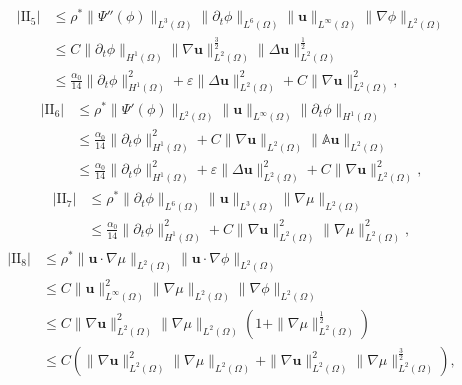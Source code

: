 \documentclass[11pt]{article}
\numberwithin{equation}{section}
\begin{document}
\begin{equation}\label{4.29}
\begin{split}
|\text{II}_5|&\leq \rho^*\|\Psi''(\phi)\|_{L^3(\Omega)}\|\partial_t\phi\|_{L^6(\Omega)}
\|\mathbf{u}\|_{L^{\infty}(\Omega)}\|\nabla\phi\|_{L^2(\Omega)} \\
&\leq C\|\partial_t\phi\|_{H^1(\Omega)}
\|\nabla\mathbf{u}\|_{L^2(\Omega)}^{\frac{3}{2}}
\|\Delta\mathbf{u}\|_{L^2(\Omega)}^{\frac{1}{2}} \\
&\leq \frac{\alpha_0}{14}\|\partial_t\phi\|_{H^1(\Omega)}^2 + \varepsilon\|\Delta\mathbf{u}\|_{L^2(\Omega)}^2 + C\|\nabla\mathbf{u}\|_{L^2(\Omega)}^2 ,
\end{split}
\end{equation}
\begin{equation}\label{4.30}
\begin{split}
|\text{II}_6|&\leq \rho^*\|\Psi'(\phi)\|_{L^2(\Omega)}\|\mathbf{u}\|_{L^{\infty}(\Omega)}
\|\partial_t\phi\|_{H^1(\Omega)}\\
&\leq \frac{\alpha_0}{14}\|\partial_t\phi\|_{H^1(\Omega)}^2 + C\|\nabla\mathbf{u}\|_{L^2(\Omega)}\|\mathbb{A}\mathbf{u}\|_{L^2(\Omega)} \\
&\leq \frac{\alpha_0}{14}\|\partial_t\phi\|_{H^1(\Omega)}^2 + \varepsilon\|\Delta\mathbf{u}\|_{L^2(\Omega)}^2 + C\|\nabla\mathbf{u}\|_{L^2(\Omega)}^2 ,
\end{split}
\end{equation}
\begin{equation}\label{4.31}
\begin{split}
|\text{II}_7|&\leq \rho^*\|\partial_t\phi\|_{L^6(\Omega)}\|\mathbf{u}\|_{L^3(\Omega)}
\|\nabla\mu\|_{L^2(\Omega)} \\
&\leq \frac{\alpha_0}{14}\|\partial_t\phi\|_{H^1(\Omega)}^2 + C\|\nabla\mathbf{u}\|_{L^2(\Omega)}^2\|\nabla\mu\|_{L^2(\Omega)}^2 ,
\end{split}
\end{equation}
\begin{equation}\label{4.32}
\begin{split}
|\text{II}_8|&\leq \rho^*\|\mathbf{u}\cdot\nabla\mu\|_{L^2(\Omega)}\|\mathbf{u}\cdot
\nabla\phi\|_{L^2(\Omega)} \\
&\leq C\|\mathbf{u}\|_{L^{\infty}(\Omega)}^2\|\nabla\mu\|_{L^2(\Omega)}
\|\nabla\phi\|_{L^2(\Omega)}\\
&\leq C\|\nabla\mathbf{u}\|_{L^2(\Omega)}^2\|\nabla\mu\|_{L^2(\Omega)}(1 + \|\nabla\mu\|_{L^2(\Omega)}^{\frac{1}{2}}) \\
&\leq C(\|\nabla\mathbf{u}\|_{L^2(\Omega)}^2\|\nabla\mu\|_{L^2(\Omega)} + \|\nabla\mathbf{u}\|_{L^2(\Omega)}^2\|\nabla\mu\|_{L^2(\Omega)}^{\frac{3}{2}}) ,
\end{split}
\end{equation}
\end{document}
